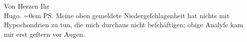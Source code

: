 \begin{ledgroupsized}[t]{13cm}
           \pstart
           Von Herzen Ihr{\\[\baselineskip]}\spacefill\mbox{Hugo.}\pend
           \leftskip=0em{}\pstart
           \noindent{}\textsc{PS}. Meine oben gemeldete Niedergeſchlagenheit hat nichts
                  mit Hypochondrien zu tun, die mich durchaus nicht beſchäftigen; obige Analyſe kam
                  mir erst geſtern vor Augen.\pend
           \endnumbering{}\end{ledgroupsized}  \newcommand{\dateiname}{L02182}\newcommand{\titel}{Hugo von Hofmannsthal an Arthur Schnitzler, [13. 6. 1914]}\newcommand{\editorInnen}{Martin Anton Müller und Gerd-Hermann Susen}
      